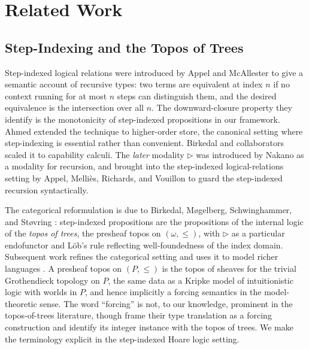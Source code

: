 \section{Related Work}
\label{sec:related}

\subsection{Step-Indexing and the Topos of Trees}
\label{sec:topos}

Step-indexed logical relations were introduced by Appel and McAllester
\citeyearpar{appel-mcallester2001} to give a semantic account of recursive
types: two terms are equivalent at index $n$ if no context running for
at most $n$ steps can distinguish them, and the desired equivalence is
the intersection over all $n$.  The downward-closure property they
identify is the monotonicity of step-indexed propositions in our
framework.  Ahmed \citeyearpar{ahmed2004} extended the technique to
higher-order store, the canonical setting where step-indexing is
essential rather than convenient.  Birkedal and collaborators
\citeyearpar{birkedal-et-al-2011-stepindexed} scaled it to capability calculi.
The \emph{later} modality $\triangleright$ was introduced by
Nakano \citeyearpar{nakano2000} as a modality for recursion, and
brought into the step-indexed logical-relations setting by Appel,
Melli\`es, Richards, and Vouillon \citeyearpar{appel-melham-mcallester2007}
to guard the step-indexed recursion syntactically.

The categorical reformulation is due to Birkedal, Møgelberg,
Schwinghammer, and Støvring \citeyearpar{birkedal-et-al-2012}: step-indexed
propositions are the propositions of the internal logic of the
\emph{topos of trees}, the presheaf topos on $(\omega, \le)$, with
$\triangleright$ as a particular endofunctor and Löb's rule reflecting
well-foundedness of the index domain.  Subsequent work refines the
categorical setting and uses it to model richer languages
\cite{bizjak-grathwohl-clouston-mogelberg-birkedal-2016}.  A presheaf
topos on $(P, \le)$ is the topos of sheaves for the trivial
Grothendieck topology on $P$, the same data as a Kripke model of
intuitionistic logic with worlds in $P$, and hence implicitly a
forcing semantics in the model-theoretic sense.  The word
``forcing'' is not, to our knowledge, prominent in the topos-of-trees
literature, though \citet{jaber-tabareau-sozeau-2012} frame their
type translation as a forcing construction and identify its integer
instance with the topos of trees.  We make the terminology explicit
in the step-indexed Hoare logic setting.

